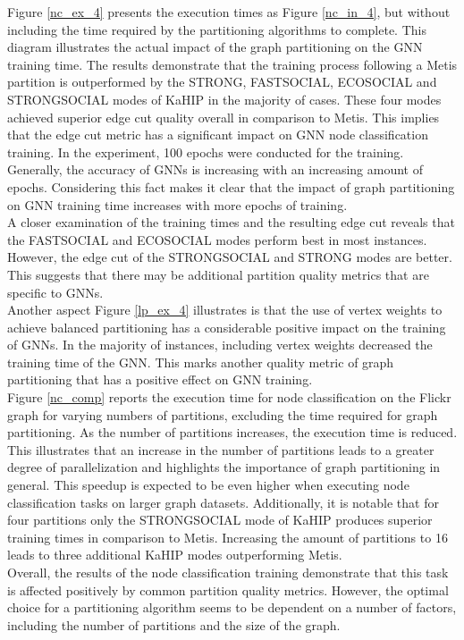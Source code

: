 \documentclass[acmsmall,nonacm,screen,review]{acmart}
\begin{document}
Figure \ref{nc_ex_4} presents the execution times as Figure \ref{nc_in_4}, but without including the time required by the partitioning algorithms to complete. This diagram illustrates the actual impact of the graph partitioning on the GNN training time. The results demonstrate that the training process following a Metis partition is outperformed by the STRONG, FASTSOCIAL, ECOSOCIAL and STRONGSOCIAL modes of KaHIP in the majority of cases. These four modes achieved superior edge cut quality overall in comparison to Metis. This implies that the edge cut metric has a significant impact on GNN node classification training. In the experiment, 100 epochs were conducted for the training. Generally, the accuracy of GNNs is increasing with an increasing amount of epochs. Considering this fact makes it clear that the impact of graph partitioning on GNN training time increases with more epochs of training. \\
A closer examination of the training times and the resulting edge cut reveals that the FASTSOCIAL and ECOSOCIAL modes perform best in most instances. However, the edge cut of the STRONGSOCIAL and STRONG modes are better. This suggests that there may be additional partition quality metrics that are specific to GNNs.\\
Another aspect Figure \ref{lp_ex_4} illustrates is that the use of vertex weights to achieve balanced partitioning has a considerable positive impact on the training of GNNs. In the majority of instances, including vertex weights decreased the training time of the GNN. This marks another quality metric of graph partitioning that has a positive effect on GNN training.\\
Figure \ref{nc_comp} reports the execution time for node classification on the Flickr graph for varying numbers of partitions, excluding the time required for graph partitioning. As the number of partitions increases, the execution time is reduced. This illustrates that an increase in the number of partitions leads to a greater degree of parallelization and highlights the importance of graph partitioning in general. This speedup is expected to be even higher when executing node classification tasks on larger graph datasets. Additionally, it is notable that for four partitions only the STRONGSOCIAL mode of KaHIP produces superior training times in comparison to Metis. Increasing the amount of partitions to 16 leads to three additional KaHIP modes outperforming Metis.\\
Overall, the results of the node classification training demonstrate that this task is affected positively by common partition quality metrics. However, the optimal choice for a partitioning algorithm seems to be dependent on a number of factors, including the number of partitions and the size of the graph.
\end{document}
